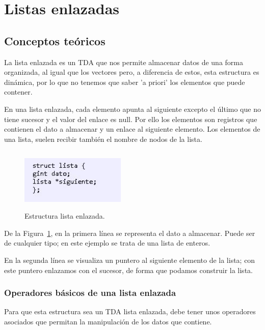 \documentclass[10pt,journal]{IEEEtran}
\begin{document}
\section{\textbf{Listas enlazadas}}
\subsection{\textbf{Conceptos teóricos}}
La lista enlazada es un TDA que nos permite almacenar datos de una forma organizada, al igual que los vectores pero, a diferencia de estos, esta estructura es dinámica, por lo que no tenemos que saber 'a priori' los elementos que puede contener.

En una lista enlazada, cada elemento apunta al siguiente excepto el último que no tiene sucesor y el valor del enlace es null. Por ello los elementos son registros que contienen el dato a almacenar y un enlace al siguiente elemento. Los elementos de una lista, suelen recibir también el nombre de nodos de la lista.
\begin{figure}[H]
 \begin{center}
       \includegraphics[width=5cm, height=3cm]{figuras/1.JPG}
      \caption{Estructura lista enlazada.}
      \label{f1} 
      \end{center}
\end{figure}
De la Figura~\ref{f1}, en la primera línea se representa el dato a almacenar. Puede ser de cualquier tipo; en este ejemplo se trata de una lista de enteros.\par
En la segunda línea se visualiza un puntero al siguiente elemento de la lista; con este puntero enlazamos con el sucesor, de forma que podamos construir la lista.

\subsubsection{\textbf{Operadores básicos de una lista enlazada}}
Para que esta estructura sea un TDA lista enlazada, debe tener unos operadores asociados que permitan la manipulación de los datos que contiene.\par
\end{document}
